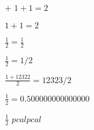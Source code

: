 $+$
$1+1 = 2$

$1+1 = 2$

$\frac{1}{2} = \frac{1}{2}$

$\frac{1}{2} = 1/2$

$\frac{1+12322}{2} = 12323/2$

$\frac{1}{2} = 0.500000000000000$

$\frac{1}{2}$ $pcal  pcal$
